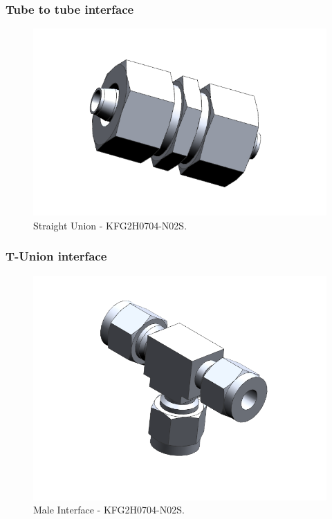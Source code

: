 \subsubsection{Tube to tube interface}


\begin{figure}[H]
    \centering
    \includegraphics[width=1\textwidth]{appendix/img/interfaces/Interface_Tube_Tube.png}
    \caption{Straight Union - KFG2H0704-N02S.}
    \label{fig:STRAIGHT_interface}
\end{figure}


\subsubsection{T-Union interface}


\begin{figure}[H]
    \centering
    \includegraphics[width=1\textwidth]{appendix/img/interfaces/Interface_T_Union.png}
    \caption{Male Interface - KFG2H0704-N02S.}
    \label{fig:T_interface}
\end{figure}

